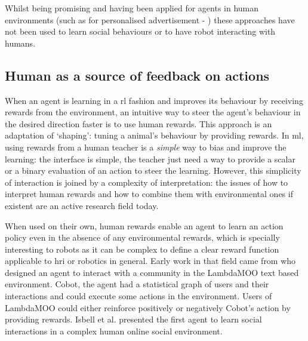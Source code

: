 	Whilst being promising and having been applied for agents in human environments (such as for personalised advertisement - \citealt{theocharous2015personalized})	these approaches have not been used to learn social behaviours or to have robot interacting with humans.

\subsection{Human as a source of feedback on actions}

When an agent is learning in a \gls{rl} fashion and improves its behaviour by receiving rewards from the environment, an intuitive way to steer the agent's behaviour in the desired direction faster is to use human rewards. This approach is an adaptation of `shaping': tuning a animal's behaviour by providing rewards. In \gls{ml}, using rewards from a human teacher is a \textit{simple} way to bias and improve the learning: the interface is simple, the teacher just need a way to provide a scalar or a binary evaluation of an action to steer the learning. However, this simplicity of interaction is joined by a complexity of interpretation: the issues of how to interpret human rewards and how to combine them with environmental ones if existent are an active research field today.

When used on their own, human rewards enable an agent to learn an action policy even in the absence of any environmental rewards, which is specially interesting to robots as it can be complex to define a clear reward function applicable to \gls{hri} or robotics in general. Early work in that field came from \cite{isbell2006cobot} who designed an agent to interact with a community in the LambdaMOO text based environment. Cobot, the agent had a statistical graph of users and their interactions and could execute some actions in the environment. Users of LambdaMOO could either reinforce positively or negatively Cobot's action by providing rewards. Isbell et al. presented the first agent to learn social interactions in a complex human online social environment. 

